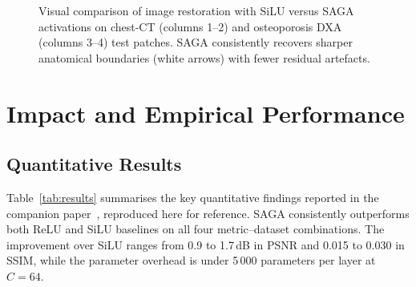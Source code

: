 \documentclass[preprint,12pt]{elsarticle}
\begin{document}
\begin{figure}[t]
  \centering
  \caption{Visual comparison of image restoration with SiLU versus SAGA
           activations on chest-CT (columns 1--2) and osteoporosis DXA
           (columns 3--4) test patches.
           SAGA consistently recovers sharper anatomical boundaries
           (white arrows) with fewer residual artefacts.}
  \label{fig:gallery}
\end{figure}

\section{Impact and Empirical Performance}
\label{sec:impact}

\subsection{Quantitative Results}

Table~\ref{tab:results} summarises the key quantitative findings reported in
the companion paper~\cite{siju2026saga}, reproduced here for reference.
SAGA consistently outperforms both ReLU and SiLU baselines on all four
metric--dataset combinations.
The improvement over SiLU ranges from 0.9 to 1.7\,dB in PSNR and 0.015 to
0.030 in SSIM, while the parameter overhead is under 5\,000 parameters per
layer at $C = 64$.
\end{document}
